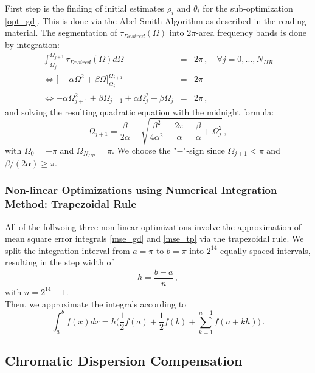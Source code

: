 \documentclass[paper=a4, fontsize=11pt]{scrartcl} %
\numberwithin{equation}{section} %
\numberwithin{figure}{section} %
\numberwithin{table}{section} %
\begin{document}
First step is the finding of initial estimates $\rho_i$ and $\theta_i$ for the sub-optimization \eqref{opt_gd}. This is done via the Abel-Smith Algorithm as described in the reading material. The segmentation of $\tau_{Desired}(\Omega)$ into $2\pi$-area frequency bands is done by integration:
\begin{eqnarray}
\int_{\Omega_j}^{\Omega_{j+1}}\tau_{Desired}(\Omega)d\Omega&=&2\pi\, , \quad \forall j = 0, ... , N_{IIR}\nonumber\\
\iff\Big[-\alpha\Omega^2+\beta\Omega\Big]_{\Omega_j}^{\Omega_{j+1}}&=&2\pi\nonumber\\
\iff-\alpha\Omega_{j+1}^2+\beta\Omega_{j+1}+\alpha\Omega_{j}^2-\beta\Omega_{j}&=&2\pi\label{quad_as}\, ,
\end{eqnarray}
and solving the resulting quadratic equation with the midnight formula:
\begin{equation} 
\Omega_{j+1}=\frac{\beta}{2\alpha}-\sqrt{\frac{\beta^2}{4\alpha^2}-\frac{2\pi}{\alpha}-\frac{\beta}{\alpha}+\Omega_j^2}\label{midnight}\, ,
\end{equation}
with $\Omega_{0}=-\pi$ and $\Omega_{N_{IIR}}=\pi$. We choose the "$-$"-sign since $\Omega_{j+1}<\pi$ and $\beta/(2\alpha)\geq\pi$.

\subsubsection{Non-linear Optimizations using Numerical Integration Method: Trapezoidal Rule}

All of the follwoing three non-linear optimizations involve the approximation of mean square error integrals \eqref{mse_gd} and \eqref{mse_tp} via the trapezoidal rule. We split the integration interval from $a=\pi$ to $b=\pi$ into $2^{14}$ equally spaced intervals, resulting in the step width of
\begin{equation} 
h=\frac{b-a}{n}\label{sw}\, ,
\end{equation}
with $n=2^{14}-1$.\\
Then, we approximate the integrals according to
\begin{equation} 
\int_{a}^{b}f(x)dx=h\Big(\frac{1}{2}f(a)+\frac{1}{2}f(b)+\sum_{k=1}^{n-1}f(a+kh)\Big)\label{num_int}\, .
\end{equation}

\subsection{Chromatic Dispersion Compensation}
\end{document}
